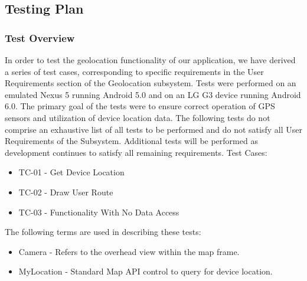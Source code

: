 ﻿\documentclass{article}
\begin{document}

\newpage
\subsection{Testing Plan}
\subsubsection{Test Overview}
In order to test the geolocation functionality of our application, we have derived a series of test cases, corresponding to specific requirements in the User Requirements section of the Geolocation subsystem.
Tests were performed on an emulated Nexus 5 running Android 5.0 and on an LG G3 device running Android 6.0. The primary goal of the tests were to ensure correct operation of GPS sensors and utilization of device location data. The following tests do not comprise an exhaustive list of all tests to be performed and do not satisfy all User Requirements of the Subsystem. Additional tests will be performed as development continues to satisfy all remaining requirements.
Test Cases:
\begin{itemize}
\item TC-01 - Get Device Location
\item TC-02 - Draw User Route
\item TC-03 - Functionality With No Data Access
\end {itemize}
The following terms are used in describing these tests:
\begin{itemize}
\item Camera - Refers to the overhead view within the map frame.
\item MyLocation - Standard Map API control to query for device location.
\end {itemize}
\end{document}
